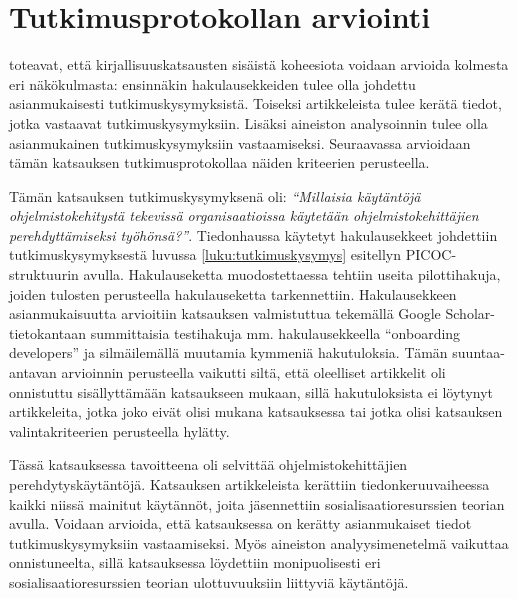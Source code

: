 \documentclass[utf8]{gradu3}
\begin{document}
\section{Tutkimusprotokollan arviointi}
\label{luku-tutkimusprotokollan-arviointi}

\textcite{kitchenham-charters-2007} toteavat, että kirjallisuuskatsausten sisäistä koheesiota voidaan arvioida kolmesta eri näkökulmasta: ensinnäkin hakulausekkeiden tulee olla johdettu asianmukaisesti tutkimuskysymyksistä. Toiseksi artikkeleista tulee kerätä tiedot, jotka vastaavat tutkimuskysymyksiin. Lisäksi aineiston analysoinnin tulee olla asianmukainen tutkimuskysymyksiin vastaamiseksi. Seuraavassa arvioidaan tämän katsauksen tutkimusprotokollaa näiden kriteerien perusteella.

Tämän katsauksen tutkimuskysymyksenä oli: \textit{“Millaisia käytäntöjä ohjelmistokehitystä tekevissä organisaatioissa käytetään ohjelmistokehittäjien perehdyttämiseksi työhönsä?”}. Tiedonhaussa käytetyt hakulausekkeet johdettiin tutkimuskysymyksestä luvussa \ref{luku:tutkimuskysymys} esitellyn PICOC-struktuurin avulla. Hakulauseketta muodostettaessa tehtiin useita pilottihakuja, joiden tulosten perusteella hakulauseketta tarkennettiin. Hakulausekkeen asianmukaisuutta arvioitiin katsauksen valmistuttua tekemällä Google Scholar-tietokantaan summittaisia testihakuja mm. hakulausekkeella “onboarding developers” ja silmäilemällä muutamia kymmeniä hakutuloksia. Tämän suuntaa-antavan arvioinnin perusteella vaikutti siltä, että oleelliset artikkelit oli onnistuttu sisällyttämään katsaukseen mukaan, sillä hakutuloksista ei löytynyt artikkeleita, jotka joko eivät olisi mukana katsauksessa tai jotka olisi katsauksen valintakriteerien perusteella hylätty. 

Tässä katsauksessa tavoitteena oli selvittää ohjelmistokehittäjien perehdytyskäytäntöjä. Katsauksen artikkeleista kerättiin tiedonkeruuvaiheessa kaikki niissä mainitut käytännöt, joita jäsennettiin sosialisaatioresurssien teorian avulla. Voidaan arvioida, että katsauksessa on kerätty asianmukaiset tiedot tutkimuskysymyksiin vastaamiseksi. Myös aineiston analyysimenetelmä vaikuttaa onnistuneelta, sillä katsauksessa löydettiin monipuolisesti eri sosialisaatioresurssien teorian ulottuvuuksiin liittyviä käytäntöjä.
\end{document}
